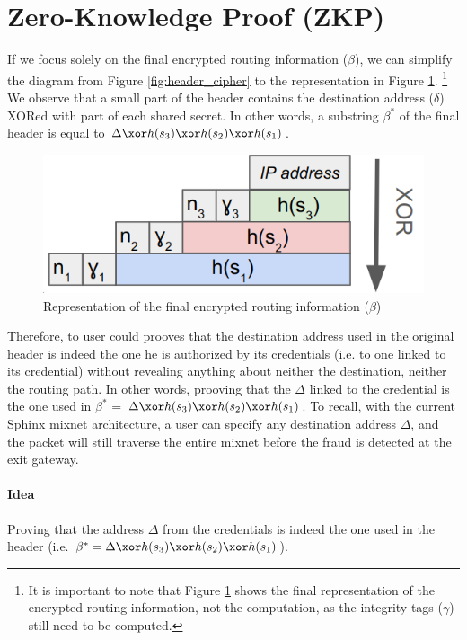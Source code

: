 \section{Zero-Knowledge Proof (ZKP)}

If we focus solely on the final encrypted routing information ($\beta$), we can simplify the diagram from Figure \ref{fig:header_cipher} to the representation in Figure \ref{fig:schema_final_header}.
\footnote{It is important to note that Figure \ref{fig:schema_final_header} shows the final representation of the encrypted routing information, not the computation, as the integrity tags ($\gamma$) still need to be computed.}
We observe that a small part of the header contains the destination address ($\delta$) XORed with part of each shared secret. 
In other words, a substring $\beta^*$ of the final header is equal to $\Delta \xor h(s_3) \xor h(s_2) \xor h(s_1)$.

\begin{figure}[H]
    \centering
    \includegraphics[width=0.5\linewidth]{Images/structure_final_header.png}
    \caption{Representation of the final encrypted routing information ($\beta$)}
    \label{fig:schema_final_header}
\end{figure}

Therefore, to user could prooves that the destination address used in the original header is indeed the one he is authorized by its credentials (i.e. to one linked to its credential) without revealing anything about neither the destination, neither the routing path. 
In other words, prooving that the $\Delta$ linked to the credential is the one used in $\beta^*$ = $\Delta \xor h(s_3) \xor h(s_2) \xor h(s_1)$.
To recall, with the current Sphinx mixnet architecture, a user can specify any destination address $\Delta$, and the packet will still traverse the entire mixnet before the fraud is detected at the exit gateway.

\paragraph{Idea} Proving that the address $\Delta$ from the credentials is indeed the one used in the header (i.e. $\beta^* = \Delta \xor h(s_3) \xor h(s_2) \xor h(s_1)$).

